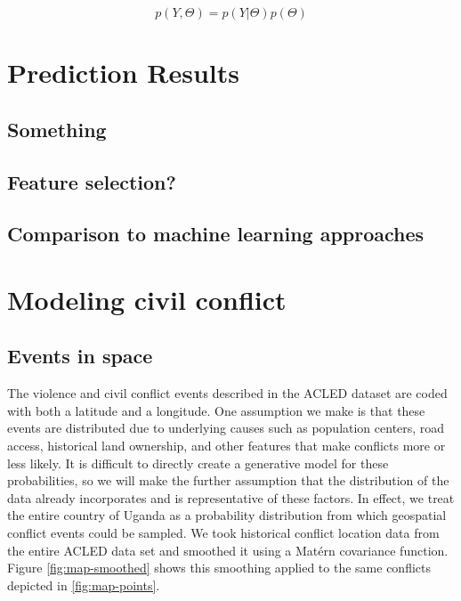 \documentclass{article} %
\begin{document}
\begin{equation*}
p(Y,\Theta)=p(Y|\Theta)p(\Theta)
\end{equation*}

\section{Prediction Results}

\subsection{Something}
\subsection{Feature selection?}
\subsection{Comparison to machine learning approaches}

\section{Modeling civil conflict}

\subsection{Events in space}

The violence and civil conflict events described in the ACLED dataset are coded with both a latitude and a longitude. One assumption we make is that these events are distributed due to underlying causes such as population centers, road access, historical land ownership, and other features that make conflicts more or less likely. It is difficult to directly create a generative model for these probabilities, so we will make the further assumption that the distribution of the data already incorporates and is representative of these factors. In effect, we treat the entire country of Uganda as a probability distribution from which geospatial conflict events could be sampled.  We took historical conflict location data from the entire ACLED data set and smoothed it using a Mat\'{e}rn covariance function.  Figure \ref{fig:map-smoothed} shows this smoothing applied to the same conflicts depicted in \ref{fig:map-points}.
\end{document}
